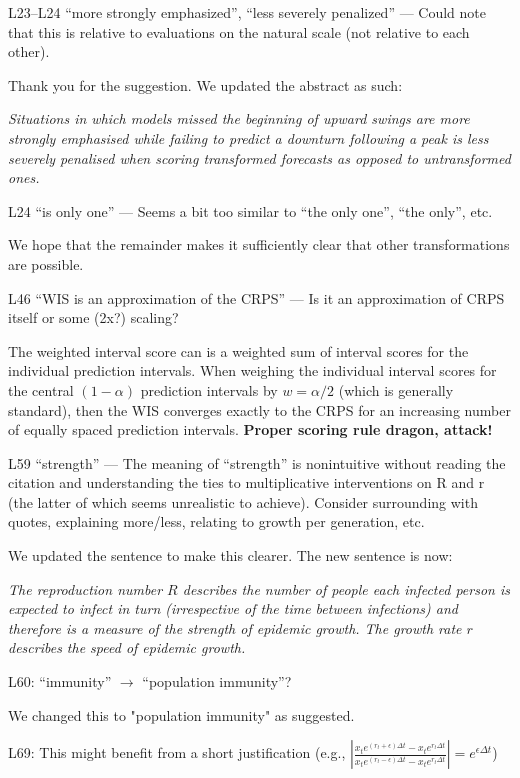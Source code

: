 \documentclass{article}
\newcommand{\red}{\color{red}}
\newcommand{\black}{\color{black}}
\newcommand{\blue}{\color{blue}}
\begin{document}
\blue
L23–L24 “more strongly emphasized”, “less severely penalized” — Could note that this is relative to evaluations on the natural scale (not relative to each other).

\black
Thank you for the suggestion. We updated the abstract as such: 

\textit{Situations in which models missed the beginning of upward swings are more strongly emphasised while failing to predict a downturn following a peak is less severely penalised when scoring transformed forecasts as opposed to untransformed ones.}

\red
L24 “is only one” — Seems a bit too similar to “the only one”, “the only”, etc.

\black
We hope that the remainder makes it sufficiently clear that other transformations are possible. 

\blue
L46 “WIS is an approximation of the CRPS” — Is it an approximation of CRPS itself or some (2x?) scaling?

\black
The weighted interval score can is a weighted sum of interval scores for the individual prediction intervals. When weighing the individual interval scores for the central $(1 − \alpha)$ prediction intervals by 
$w = \alpha / 2$ (which is generally standard), then the WIS converges exactly to the CRPS for an increasing number of equally spaced prediction intervals. 
\textbf{Proper scoring rule dragon, attack!}

\blue
L59 “strength” — The meaning of “strength” is nonintuitive without reading the citation and understanding the ties to multiplicative interventions on R and r (the latter of which seems unrealistic to achieve). Consider surrounding with quotes, explaining more/less, relating to growth per generation, etc.

\black
We updated the sentence to make this clearer. The new sentence is now: 

\textit{The reproduction number $R$ describes the number of people each infected person is expected to infect in turn (irrespective of the time between infections) and therefore is a measure of the strength of epidemic growth. The growth rate $r$ describes the speed of epidemic growth.}

\blue
L60: “immunity” $\xrightarrow{}$ “population immunity”?

\black
We changed this to "population immunity" as suggested. 

\red
L69: This might benefit from a short justification (e.g.,
$\left| \frac{x_t e^{(r_t + \epsilon) \Delta t} - x_t e^{r_t \Delta t}}{x_t e^{(r_t - \epsilon) \Delta t} - x_t e^{r_t \Delta t}} \right| = e^{\epsilon\Delta t}$)
\end{document}
